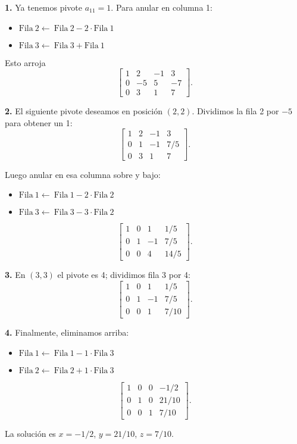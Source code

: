 \noindent \textbf{1.} Ya tenemos pivote \(a_{11}=1\). Para anular en columna 1:
\begin{itemize}
  \item \(\text{Fila} ~ 2 \leftarrow ~ \text{Fila} ~ 2 - 2\cdot\text{Fila} ~ 1\)
  \item \(\text{Fila} ~ 3 \leftarrow ~ \text{Fila} ~ 3 + \text{Fila} ~ 1\)
\end{itemize}
Esto arroja
\[
\left[\begin{array}{ccc|c}
1 & 2 & -1 & 3\\
0 & -5 & 5 & -7\\
0 & 3 & 1 & 7
\end{array}\right].
\]

\noindent \textbf{2.} El siguiente pivote deseamos en posición \((2,2)\). Dividimos la fila 2 por \(-5\) para obtener un 1:
\[
\left[\begin{array}{ccc|c}
1 & 2 & -1 & 3\\
0 & 1 & -1 & 7/5\\
0 & 3 & 1 & 7
\end{array}\right].
\]

Luego anular en esa columna sobre y bajo:
\begin{itemize}
  \item \(\text{Fila} ~ 1 \leftarrow ~ \text{Fila} ~ 1 - 2\cdot\text{Fila} ~ 2\)
  \item \(\text{Fila} ~ 3 \leftarrow ~ \text{Fila} ~ 3 - 3\cdot\text{Fila} ~ 2\)
\end{itemize}

\[
\left[\begin{array}{ccc|c}
1 & 0 & 1 & 1/5\\
0 & 1 & -1 & 7/5\\
0 & 0 & 4 & 14/5
\end{array}\right].
\]

\noindent \textbf{3.} En \((3,3)\) el pivote es 4; dividimos fila 3 por 4:
\[
\left[\begin{array}{ccc|c}
1 & 0 & 1 & 1/5\\
0 & 1 & -1 & 7/5\\
0 & 0 & 1 & 7/10
\end{array}\right].
\]

\noindent \textbf{4.} Finalmente, eliminamos arriba:
\begin{itemize}
  \item \(\text{Fila} ~ 1 \leftarrow ~ \text{Fila} ~ 1 - 1\cdot\text{Fila} ~ 3\)
  \item \(\text{Fila} ~ 2 \leftarrow ~ \text{Fila} ~ 2 + 1\cdot\text{Fila} ~ 3\)
\end{itemize}

\[
\left[\begin{array}{ccc|c}
1 & 0 & 0 & -1/2\\
0 & 1 & 0 & 21/10\\
0 & 0 & 1 & 7/10
\end{array}\right].
\]

La solución es \(x=-1/2\), \(y=21/10\), \(z=7/10\).